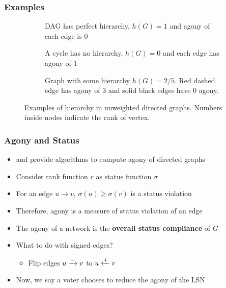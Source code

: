 \documentclass{beamer}
\begin{document}
\begin{frame}
    \frametitle{Examples}
    \begin{figure}[!ht]
        \centering
        \begin{subfigure}[t]{0.5\textwidth}
            \centering
            \scalebox{0.5}{}
            \caption{DAG has perfect hierarchy, $h(G)=1$ and agony of each edge is 0}
            \label{fig:dag}
        \end{subfigure}

        \begin{subfigure}[t]{0.4\textwidth}
            \centering
            \scalebox{0.5}{}
            \caption{A cycle has no hierarchy, $h(G)=0$ and each edge has agony of 1}
            \label{fig:cycle}
        \end{subfigure}
        \hspace{4mm}%
        \begin{subfigure}[t]{0.4\textwidth}
            \centering
            \scalebox{0.5}{}
            \caption{Graph with some hierarchy $h(G)=2/5$. Red dashed edge has agony of 3 and solid black edges have 0 agony.  }
            \label{fig:some-hierarchy}
        \end{subfigure}
        \caption{Examples of hierarchy in unweighted directed graphs. Numbers inside nodes indicate the rank of vertex.}
        \label{fig:hierarchy} 
    \end{figure}
\end{frame}

\begin{frame}
    \frametitle{Agony and Status}
    \begin{itemize}
        \item \cite{gupte2011finding} and \cite{tatti2017tiers} provide algorithms to compute agony of directed graphs
        \item Consider rank function $r$ as status function $\sigma$
        \item For an edge $u \rightarrow v$, $\sigma(u)\geq\sigma(v)$ is a status violation
        \item Therefore, agony is a measure of status violation of an edge
        \item The agony of a network is the \textbf{overall status compliance} of $G$
        \item What to do with signed edges?
        \begin{itemize}
            \item Flip edges $u \xrightarrow{-} v$ to $u \xleftarrow{+} v$
        \end{itemize}
        \item Now, we say a voter chooses to reduce the agony of the LSN
    \end{itemize}

\end{frame}
\end{document}

